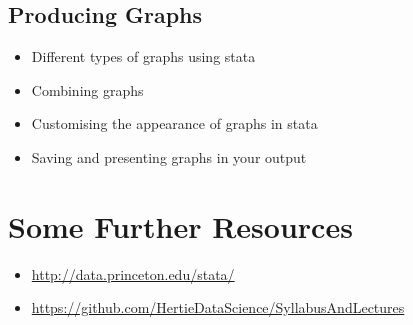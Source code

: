 \documentclass{scrartcl}
\begin{document}
\subsection{Producing Graphs}
\begin{itemize}
  \item Different types of graphs using stata
  \item Combining graphs
  \item Customising the appearance of graphs in stata
  \item Saving and presenting graphs in your output
\end{itemize}



\section*{Some Further Resources}
\begin{itemize}
  \item \url{http://data.princeton.edu/stata/}
  \item \url{https://github.com/HertieDataScience/SyllabusAndLectures}
\end{itemize}



\end{document}
